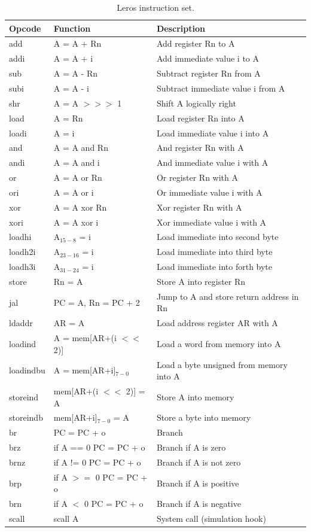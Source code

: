 \documentclass[%
    10pt, %
    headinclude, footexclude,
    openright, %
    notitlepage,
    cleardoubleempty,
    headsepline,
    pointlessnumbers,
    bibtotoc, idxtotoc,
    ]{scrbook}
\begin{document}
\begin{table}
\centering
\begin{tabular}{lll}
\toprule
Opcode & Function & Description\\
\midrule
add & A = A + Rn & Add register Rn to A \\
addi & A = A + i & Add immediate value i to A \\
sub & A = A - Rn & Subtract register Rn from A \\
subi & A = A - i & Subtract immediate value i from A \\
shr & A = A $>>>$ 1 & Shift A logically right \\
load & A = Rn & Load register Rn into A \\
loadi & A = i & Load immediate value i into A \\
and & A = A and Rn & And register Rn with A \\
andi & A = A and i & And immediate value i with A \\
or & A = A or Rn & Or register Rn with A \\
ori & A = A or i & Or immediate value i with A \\
xor & A = A xor Rn & Xor register Rn with A \\
xori & A = A xor i & Xor immediate value i with A \\
loadhi & A$_{15-8}$ = i & Load immediate into second byte \\
loadh2i & A$_{23-16}$ = i  & Load immediate into third byte \\
loadh3i & A$_{31-24}$ = i & Load immediate into forth byte \\
store & Rn = A & Store A into register Rn \\
jal & PC = A, Rn = PC + 2 & Jump to A and store return address in Rn \\
ldaddr & AR = A & Load address register AR with A \\
loadind & A = mem[AR+(i $<<$ 2)] & Load a word from memory into A \\
loadindbu & A = mem[AR+i]$_{7-0}$  &  Load a byte unsigned from memory into A\\
storeind & mem[AR+(i $<<$ 2)] = A & Store A into memory \\
storeindb & mem[AR+i]$_{7-0}$ = A & Store a byte into memory \\
br & PC = PC + o & Branch \\
brz & if A == 0 PC = PC + o & Branch if A is zero \\
brnz & if A != 0 PC = PC + o  & Branch if A is not zero \\
brp & if A $>=$ 0 PC = PC + o & Branch if A is positive \\
brn & if A $<$ 0 PC = PC + o & Branch if A is negative \\
scall & scall A & System call (simulation hook) \\
\bottomrule
\end{tabular}
\caption{Leros instruction set.}
\label{tab:leros:isa}
\end{table}
\end{document}
